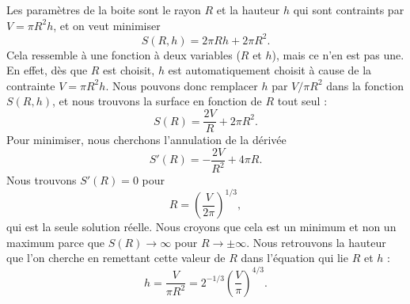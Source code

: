 \begin{corrige}{3}

Les paramètres de la boite sont le rayon $R$ et la hauteur $h$ qui sont contraints par $V=\pi R^2h$, et on veut minimiser
\begin{equation}
	S(R,h)=2\pi Rh+2\pi R^2.
\end{equation}
Cela ressemble à une fonction à deux variables ($R$ et $h$), mais ce n'en est pas une. En effet, dès que $R$ est choisit, $h$ est automatiquement choisit à cause de la contrainte $V=\pi R^2h$. Nous pouvons donc remplacer $h$ par $V/\pi R^2$ dans la fonction $S(R,h)$, et nous trouvons la surface en fonction de $R$ tout seul :
\begin{equation}
	S(R)=\frac{ 2V }{ R }+2\pi R^2.
\end{equation}
Pour minimiser, nous cherchons l'annulation de la dérivée
\begin{equation}
	S'(R)=-\frac{ 2V }{ R^2 }+4\pi R.
\end{equation}
Nous trouvons $S'(R)=0$ pour
\begin{equation}
	R=\left( \frac{ V }{ 2\pi } \right)^{1/3},
\end{equation}
qui est la seule solution réelle. Nous croyons que cela est un minimum et non un maximum parce que $S(R)\to\infty$ pour $R\to\pm\infty$. Nous retrouvons la hauteur que l'on cherche en remettant cette valeur de $R$ dans l'équation qui lie $R$ et $h$ :
\begin{equation}
	h=\frac{ V }{ \pi R^2 }=2^{-1/3}\left( \frac{ V }{ \pi } \right)^{4/3}.
\end{equation}


\end{corrige}
